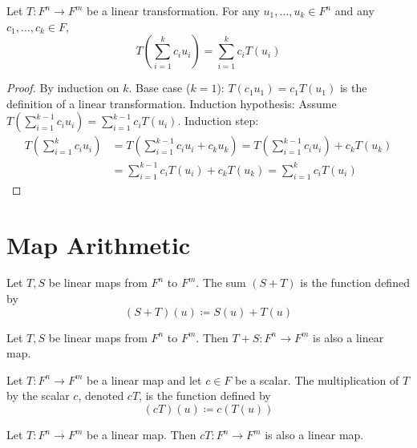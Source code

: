 \begin{theorem}\label{thm:
linear-combination-preservation} Let $T: F^n \to F^m$ be a linear transformation.
For any $u_1, \ldots, u_k \in F^n$ and any $c_1, \ldots, c_k \in F$, \[
T\left(\sum_{i=1}^{k} c_i u_i\right) = \sum_{i=1}^{k} c_i T(u_i) \]
\end{theorem}

\begin{proof} By induction on $k$. Base case ($k = 1$): $T(c_1 u_1) = c_1
T(u_1)$ is the definition of a linear transformation. Induction hypothesis:
Assume $T\left(\sum_{i=1}^{k-1} c_i u_i\right) = \sum_{i=1}^{k-1} c_i T(u_i)$.
Induction step: \begin{align*} T\left(\sum_{i=1}^{k} c_i u_i\right) &=
T\left(\sum_{i=1}^{k-1} c_i u_i + c_k u_k\right) = T\left(\sum_{i=1}^{k-1}
c_i u_i\right) + c_k T(u_k) \\ &= \sum_{i=1}^{k-1} c_i T(u_i) + c_k T(u_k) =
\sum_{i=1}^{k} c_i T(u_i) \end{align*} \end{proof}

 \section{Map Arithmetic}

\begin{definition}\label{def:sum-linear-maps} Let $T, S$ be
linear maps from $F^n$ to $F^m$. The sum $(S + T)$ is the function defined by \[
(S + T)(u) \coloneqq S(u) + T(u) \] \end{definition}

\begin{theorem}\label{thm:sum-is-linear} Let $T, S$ be linear maps from $F^n$
to $F^m$. Then $T + S: F^n \to F^m$ is also a linear map. \end{theorem}

\begin{definition}\label{def:
scalar-mult-linear-maps} Let $T: F^n \to F^m$ be a linear map and let $c \in F$
be a scalar. The multiplication of $T$ by the scalar $c$, denoted $cT$, is the
function defined by \[ (cT)(u) \coloneqq c(T(u)) \] \end{definition}

\begin{theorem}\label{thm:scalar-mult-is-linear} Let $T: F^n \to F^m$ be a
linear map. Then $cT: F^n \to F^m$ is also a linear map. \end{theorem}

